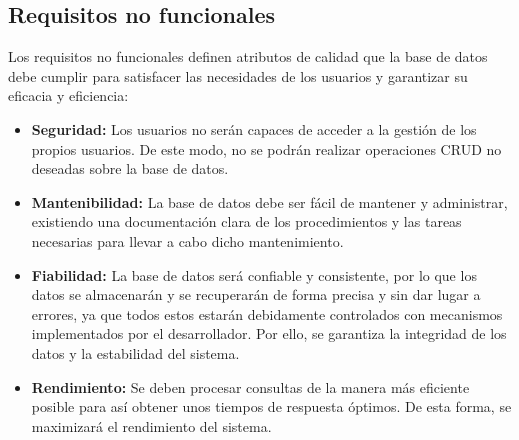 \subsection{Requisitos no funcionales}
Los requisitos no funcionales definen atributos de calidad que la base de datos debe cumplir para satisfacer las necesidades de los usuarios y garantizar su eficacia y eficiencia:

\begin{itemize}
    \item \textbf{Seguridad:} Los usuarios no serán capaces de acceder a la gestión de los propios usuarios. De este modo, no se podrán realizar operaciones CRUD no deseadas sobre la base de datos.

    \item \textbf{Mantenibilidad:} La base de datos debe ser fácil de mantener y administrar, existiendo una documentación clara de los procedimientos y las tareas necesarias para llevar a cabo dicho mantenimiento.

    \item \textbf{Fiabilidad:} La base de datos será confiable y consistente, por lo que los datos se almacenarán y se recuperarán de forma precisa y sin dar lugar a errores, ya que todos estos estarán debidamente controlados con mecanismos implementados por el desarrollador. Por ello, se garantiza la integridad de los datos y la estabilidad del sistema.

    \item \textbf{Rendimiento:} Se deben procesar consultas de la manera más eficiente posible para así obtener unos tiempos de respuesta óptimos. De esta forma, se maximizará el rendimiento del sistema.
\end{itemize}